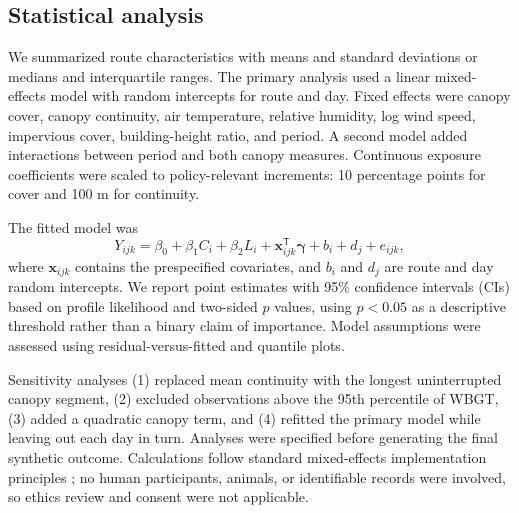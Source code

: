 \subsection{Statistical analysis}
We summarized route characteristics with means and standard deviations or medians and interquartile ranges. The primary analysis used a linear mixed-effects model with random intercepts for route and day. Fixed effects were canopy cover, canopy continuity, air temperature, relative humidity, log wind speed, impervious cover, building-height ratio, and period. A second model added interactions between period and both canopy measures. Continuous exposure coefficients were scaled to policy-relevant increments: 10 percentage points for cover and 100 m for continuity.

The fitted model was
\begin{equation}
Y_{ijk}=\beta_0+\beta_1C_i+\beta_2L_i+\boldsymbol{x}_{ijk}^{\mathsf T}
\boldsymbol{\gamma}+b_i+d_j+e_{ijk},
\label{eq:model}
\end{equation}
where $\boldsymbol{x}_{ijk}$ contains the prespecified covariates, and $b_i$ and $d_j$ are route and day random intercepts. We report point estimates with 95\% confidence intervals (CIs) based on profile likelihood and two-sided $p$ values, using $p<0.05$ as a descriptive threshold rather than a binary claim of importance. Model assumptions were assessed using residual-versus-fitted and quantile plots.

Sensitivity analyses (1) replaced mean continuity with the longest uninterrupted canopy segment, (2) excluded observations above the 95th percentile of WBGT, (3) added a quadratic canopy term, and (4) refitted the primary model while leaving out each day in turn. Analyses were specified before generating the final synthetic outcome. Calculations follow standard mixed-effects implementation principles \cite{Bates2015}; no human participants, animals, or identifiable records were involved, so ethics review and consent were not applicable.
